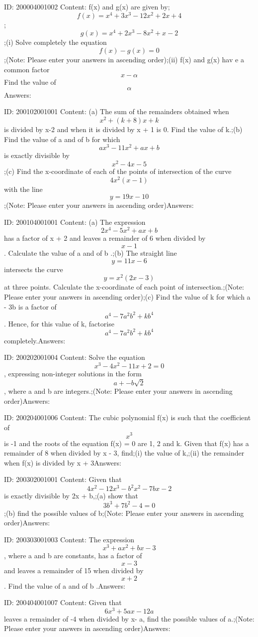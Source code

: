 \documentclass{article}
\begin{document}
ID: 200004001002
Content:
f(x) and g(x) are given by; \[f(x)=x^4+3x^3-12x^2+2x+4\]; \[g(x)=x^4+2x^3-8x^2+x-2\];(i)	Solve completely the equation \[f(x) - g(x) = 0\];(Note: Please enter your answers in ascending order);(ii) f(x) and g(x) hav e a common factor \[x-\alpha\] Find the value of \[\alpha\]Answers:

ID: 200102001001
Content:
(a)	The sum of the remainders obtained when \[x^2+(k+8)x+k\] is divided by x-2 and when it is divided by x + 1 is 0. Find the value of k.;(b) Find the value of a and of b for which \[ax^3-11x^2+ax+b\] is exactly divisible by \[x^2-4x-5\] ;(c)	Find the x-coordinate of each of the points of intersection of the curve \[4x^2(x-1)\] with the line \[y = 19 x-10\];(Note: Please enter your answers in ascending order)Answers:

ID: 200104001001
Content:
(a)	The expression $$2x^4-5x^2+ax+b$$ has a factor of x + 2 and leaves a remainder of 6 when divided by $$x - 1$$. Calculate the value of a and of b .;(b)	The straight line $$y = 11x - 6$$ intersects the curve $$y=x^2(2x-3)$$ at three points. Calculate the x-coordinate of each point of intersection.;(Note: Please enter your answers in ascending order);(c)	Find the value of k for which a - 3b is a factor of $$a^4-7a^2b^2+kb^4$$. Hence, for this value of k, factorise $$a^4-7a^2b^2+kb^4$$completely.Answers:

ID: 200202001004
Content:
Solve the equation $$x^3-4x^2-11x+2=0$$, expressing non-integer solutions in the form $$a +- b\sqrt2$$, where a and b are integers.;(Note: Please enter your answers in ascending order)Answers:

ID: 200204001006
Content:
The cubic polynomial f(x) is such that the coefficient of $$x^3$$ is -1 and the roots of the equation f(x) = 0 are 1, 2 and k. Given that f(x) has a remainder of 8 when divided by x - 3, find;(i) the value of k,;(ii) the remainder when f(x) is divided by x + 3Answers:

ID: 200302001001
Content:
Given that $$4x^2-12x^3-b^2x^2-7bx-2$$ is exactly divisible by 2x + b,;(a)	show that $$3b^3+7b^2-4=0$$;(b)	find the possible values of b;(Note: Please enter your answers in ascending order)Answers:

ID: 200303001003
Content:
The expression $$x^3+ax^2+bx-3$$, where a and b are constants, has a factor of $$x-3$$ and leaves a remainder of 15 when divided by $$x + 2$$. Find the value of a and of b .Answers:

ID: 200404001007
Content:
Given that $$6x^3+5ax-12a$$ leaves a remainder of -4 when divided by x- a, find the possible values of a.;(Note: Please enter your answers in ascending order)Answers:
\end{document}
